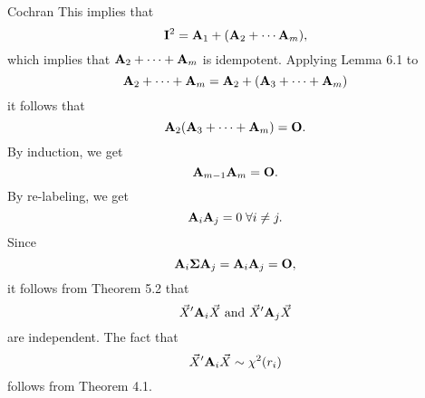 \begin{Theorem}{Cochran}{}
    This implies that
    \[ \mathbf{I}^2=\mathbf{A}_1+(\mathbf{A}_2+\cdots \mathbf{A}_m), \]
    which implies that $ \mathbf{A}_2+\cdots+\mathbf{A}_m $ is idempotent.
    Applying Lemma 6.1 to
    \[ \mathbf{A}_2+\cdots+\mathbf{A}_m=\mathbf{A}_2+(\mathbf{A}_3+\cdots+\mathbf{A}_m) \]
    it follows that
    \[ \mathbf{A}_2(\mathbf{A}_3+\cdots+\mathbf{A}_m)=\mathbf{O}. \]
    By induction, we get
    \[ \mathbf{A}_{m-1}\mathbf{A}_m=\mathbf{O}. \]
    By re-labeling, we get
    \[ \mathbf{A}_i \mathbf{A}_j=0\;\forall i\ne j. \]
    Since
    \[ \mathbf{A}_i \mathbf{\Sigma}\mathbf{A}_j=\mathbf{A}_i \mathbf{A}_j=\mathbf{O}, \]
    it follows from Theorem 5.2 that
    \[ \vec{X}' \mathbf{A}_i \vec{X} \text{ and }\vec{X}'\mathbf{A}_j \vec{X} \]
    are independent. The fact that
    \[ \vec{X}' \mathbf{A}_i \vec{X} \sim \chi^2(r_i) \]
    follows from Theorem 4.1.
\end{Theorem}